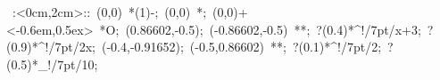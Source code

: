 %


\hbox{
\xy    <2cm,0cm>:<0cm,2cm>::
       (0,0) *\ellipse(1){-}; 
       (0,0) *{\bullet}; (0,0)+<-0.6em,0.5ex> *{O};
       (0.86602,-0.5); (-0.86602,-0.5) **\dir{-}; ?(0.4)*^!/7pt/{x+3}; ?(0.9)*^!/7pt/{2x};
       (-0.4,-0.91652); (-0.5,0.86602) **\dir{-}; ?(0.1)*^!/7pt/{2}; ?(0.5)*_!/7pt/{10};
\endxy}

